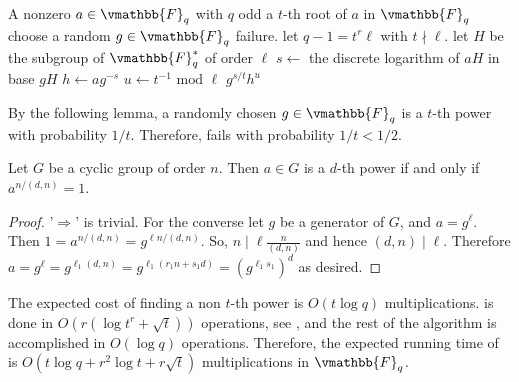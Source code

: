 \begin{algorithm}
\label{algorithm:AMM}
\begin{algorithmic}[1]
\REQUIRE A nonzero $a \in \vmathbb{F}_q$ with $q$ odd
\ENSURE a $t$-th root of $a$ in $\vmathbb{F}_{q}$
\STATE choose a random $g \in \vmathbb{F}_q$
	\RETURN failure.
\ENDIF
\STATE let $q - 1 = t^r\ell$ with $t \nmid \ell$.
\STATE let $H$ be the subgroup of $\vmathbb{F}_q^*$ of order $\ell$
\STATE $s \leftarrow $ the discrete logarithm of $aH$ in base $gH$
\label{step:AMM-dlog}
\STATE $h \leftarrow ag^{-s}$
\STATE $u \leftarrow t^{-1} \text{ mod } \ell$
\RETURN $g^{s / t}h^u$
\end{algorithmic}
\end{algorithm}

By the following lemma, a randomly chosen $g \in \vmathbb{F}_q$ is a $t$-th power with probability 
$1/t$. Therefore,  fails with probability $1/t < 1/2$.
\begin{lemma}
Let $G$ be a cyclic group of order $n$. Then $a \in G$ is a $d$-th power if and only if $a^{n/(d, 
n)} = 1$.
\end{lemma}
\begin{proof}
'$\Rightarrow$' is trivial. For the converse let $g$ be a generator of $G$, and $a = g^\ell$. Then 
$1 = a^{n / (d, n)} = g^{\ell n / (d, n)}$. So, $n \mid \ell \frac{n}{(d, n)}$ and hence $(d, n) 
\mid \ell$. Therefore $a = g^\ell = g^{\ell_1(d, n)} = g^{\ell_1(r_1n + s_1d)} = (g^{\ell_1s_1})^d$ 
as desired.
\end{proof}
The expected cost of finding a non $t$-th power is $O(t\log q)$ multiplications. 
 is done in $O(r(\log t^r + \sqrt{t}))$ operations, see 
, and the rest of the algorithm is accomplished in $O(\log q)$ 
operations. Therefore, the expected running time of  is $O(t\log q + 
r^2\log t + r\sqrt{t})$ multiplications in $\vmathbb{F}_q$.

